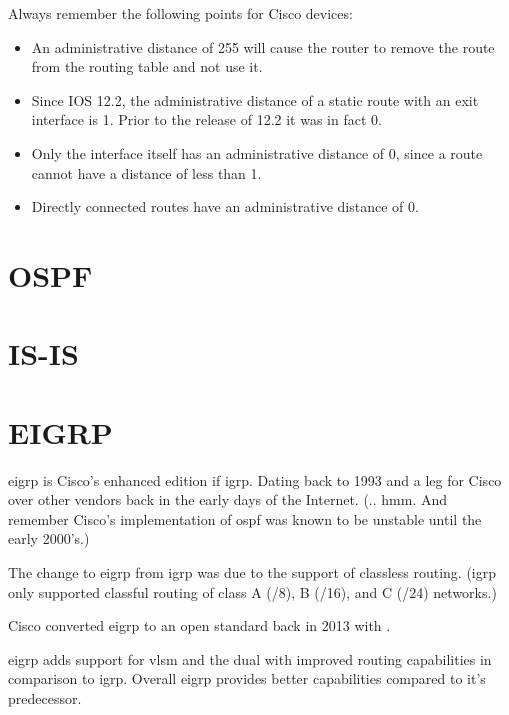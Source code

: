 Always remember the following points for Cisco devices:\cite{wiki:Administrative_distance}
\begin{itemize}
    \item An administrative distance of 255 will cause the router to remove the route from the routing table and not use it.
    \item Since IOS 12.2, the administrative distance of a static route with an exit interface is 1. Prior to the release of 12.2 it was in fact 0.
    \item Only the interface itself has an administrative distance of 0, since a route cannot have a distance of less than 1.
    \item Directly connected routes have an administrative distance of 0.
\end{itemize}

\newpage

\section{OSPF}

\newpage

\section{IS-IS}

\newpage

\section{EIGRP}

\gls{eigrp} is Cisco's enhanced edition if \gls{igrp}. Dating back to 1993 and a
leg for Cisco over other vendors back in the early days of the Internet. (..
hmm. And remember Cisco's implementation of \gls{ospf} was known to be unstable
until the early 2000's.)

The change to \gls{eigrp} from \gls{igrp} was due to the support of classless
routing. (\gls{igrp} only supported classful routing of class A (/8), B (/16),
and C (/24) networks.)

Cisco converted \gls{eigrp} to an open standard back in 2013 with
.\cite{wiki:Enhanced_Interior_Gateway_Routing_Protocol}

\gls{eigrp} adds support for \gls{vlsm} and the \gls{dual} with improved routing
capabilities in comparison to \gls{igrp}. Overall \gls{eigrp} provides better
capabilities compared to it's predecessor.

